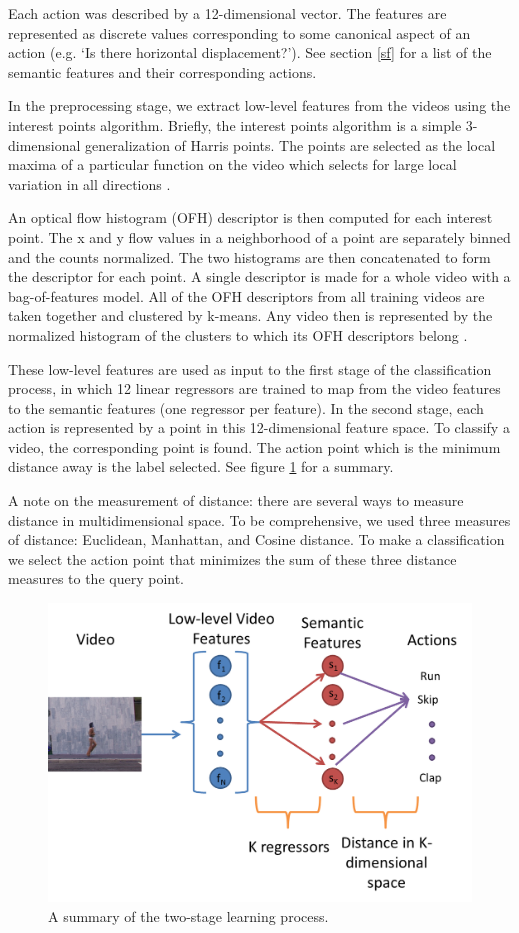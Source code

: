\documentclass{article}
\begin{document}
Each action was described by a 12-dimensional vector. The features are represented as discrete values corresponding to some canonical aspect of an action (e.g. `Is there horizontal displacement?'). See section \ref{sf} for a list of the semantic features and their corresponding actions.

In the preprocessing stage, we extract low-level features from the videos using the interest points algorithm. Briefly, the interest points algorithm is a simple 3-dimensional generalization of Harris points. The points are selected as the local maxima of a particular function on the video which selects for large local variation in all directions \cite{Laptev05}.

An optical flow histogram (OFH) descriptor is then computed for each interest point. The x and y flow values in a neighborhood of a point are separately binned and the counts normalized. The two histograms are then concatenated to form the descriptor for each point. A single descriptor is made for a whole video with a bag-of-features model. All of the OFH descriptors from all training videos are taken together and clustered by k-means. Any video then is represented by the normalized histogram of the clusters to which its OFH descriptors belong \cite{Laptev04}.

These low-level features are used as input to the first stage of the classification process, in which 12 linear regressors are trained to map from the video features to the semantic features (one regressor per feature).  In the second stage, each action is represented by a point in this 12-dimensional feature space. To classify a video, the corresponding point is found. The action point which is the minimum distance away is the label selected. See figure \ref{2stage} for a summary.

A note on the measurement of distance: there are several ways to measure distance in multidimensional space. To be comprehensive, we used three measures of distance: Euclidean, Manhattan, and Cosine distance. To make a classification we select the action point that minimizes the sum of these three distance measures to the query point.
\begin{figure}[h]
\centering
\includegraphics[width=.4\linewidth]{2stagelearning.png}
\caption{A summary of the two-stage learning process.}
\label{2stage}
\end{figure}
\end{document}

